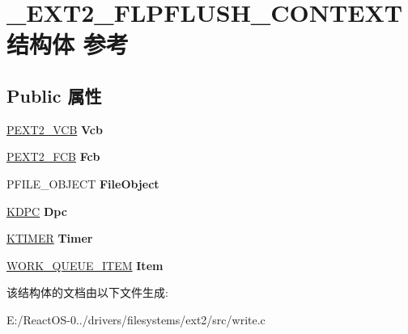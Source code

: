 \hypertarget{struct___e_x_t2___f_l_p_f_l_u_s_h___c_o_n_t_e_x_t}{}\section{\+\_\+\+E\+X\+T2\+\_\+\+F\+L\+P\+F\+L\+U\+S\+H\+\_\+\+C\+O\+N\+T\+E\+X\+T结构体 参考}
\label{struct___e_x_t2___f_l_p_f_l_u_s_h___c_o_n_t_e_x_t}
\subsection*{Public 属性}
\begin{DoxyCompactItemize}
\item 
\mbox{\label{struct___e_x_t2___f_l_p_f_l_u_s_h___c_o_n_t_e_x_t_a9f76f336300ebd2453cdcfa0ec7ba8fa}} 
\hyperlink{struct___e_x_t2___v_c_b}{P\+E\+X\+T2\+\_\+\+V\+CB} {\bfseries Vcb}
\item 
\mbox{\label{struct___e_x_t2___f_l_p_f_l_u_s_h___c_o_n_t_e_x_t_a28667abb718c1df63f13c61e5981bccc}} 
\hyperlink{struct___e_x_t2___f_c_b}{P\+E\+X\+T2\+\_\+\+F\+CB} {\bfseries Fcb}
\item 
\mbox{\label{struct___e_x_t2___f_l_p_f_l_u_s_h___c_o_n_t_e_x_t_a2f8e7f8d668cd04472e1f3a80827b3fc}} 
P\+F\+I\+L\+E\+\_\+\+O\+B\+J\+E\+CT {\bfseries File\+Object}
\item 
\mbox{\label{struct___e_x_t2___f_l_p_f_l_u_s_h___c_o_n_t_e_x_t_ab03cdf543a50bab0cdd25486377b882e}} 
\hyperlink{struct___k_d_p_c}{K\+D\+PC} {\bfseries Dpc}
\item 
\mbox{\label{struct___e_x_t2___f_l_p_f_l_u_s_h___c_o_n_t_e_x_t_a31cd69db9121959e9e6e62bf42188da4}} 
\hyperlink{struct___k_t_i_m_e_r}{K\+T\+I\+M\+ER} {\bfseries Timer}
\item 
\mbox{\label{struct___e_x_t2___f_l_p_f_l_u_s_h___c_o_n_t_e_x_t_a18d4968a7c10915a712b3e3e32b7f48d}} 
\hyperlink{struct___w_o_r_k___q_u_e_u_e___i_t_e_m}{W\+O\+R\+K\+\_\+\+Q\+U\+E\+U\+E\+\_\+\+I\+T\+EM} {\bfseries Item}
\end{DoxyCompactItemize}


该结构体的文档由以下文件生成\+:\begin{DoxyCompactItemize}
\item 
E\+:/\+React\+O\+S-\/0../drivers/filesystems/ext2/src/write.\+c\end{DoxyCompactItemize}
